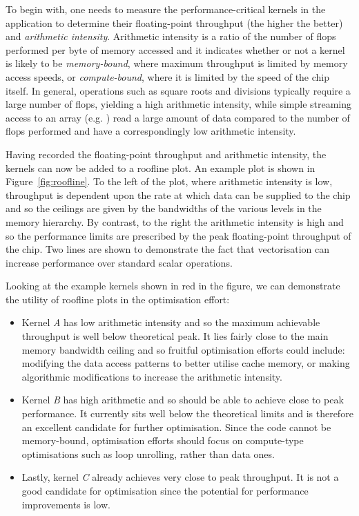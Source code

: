 To begin with, one needs to measure the performance-critical kernels in the application to determine their floating-point throughput (the higher the better) and \textit{arithmetic intensity}.
Arithmetic intensity is a ratio of the number of \glspl{flop} performed per byte of memory accessed and it indicates whether or not a kernel is likely to be \textit{memory-bound}, where maximum throughput is limited by memory access speeds, or \textit{compute-bound}, where it is limited by the speed of the chip itself.
In general, operations such as square roots and divisions typically require a large number of \glspl{flop}, yielding a high arithmetic intensity, while simple streaming access to an array (e.g. ) read a large amount of data compared to the number of \glspl{flop} performed and have a correspondingly low arithmetic intensity.

Having recorded the floating-point throughput and arithmetic intensity, the kernels can now be added to a roofline plot.
An example plot is shown in Figure~\ref{fig:roofline}.
To the left of the plot, where arithmetic intensity is low, throughput is dependent upon the rate at which data can be supplied to the chip and so the ceilings are given by the bandwidths of the various levels in the memory hierarchy.
By contrast, to the right the arithmetic intensity is high and so the performance limits are prescribed by the peak floating-point throughput of the chip.
Two lines are shown to demonstrate the fact that vectorisation can increase performance over standard scalar operations.

Looking at the example kernels shown in red in the figure, we can demonstrate the utility of roofline plots in the optimisation effort:

\begin{itemize}
  \item
    Kernel \textit{A} has low arithmetic intensity and so the maximum achievable throughput is well below theoretical peak.
    It lies fairly close to the main memory bandwidth ceiling and so fruitful optimisation efforts could include: modifying the data access patterns to better utilise cache memory, or making algorithmic modifications to increase the arithmetic intensity.

  \item
    Kernel \textit{B} has high arithmetic and so should be able to achieve close to peak performance.
    It currently sits well below the theoretical limits and is therefore an excellent candidate for further optimisation.
    Since the code cannot be memory-bound, optimisation efforts should focus on compute-type optimisations such as loop unrolling, rather than data ones.

  \item
    Lastly, kernel \textit{C} already achieves very close to peak throughput.
    It is not a good candidate for optimisation since the potential for performance improvements is low.
\end{itemize}

